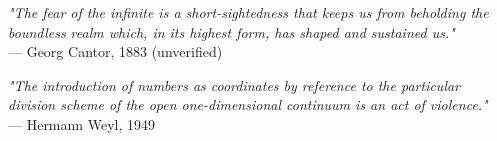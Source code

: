\begin{flushright}
\emph{"The fear of the infinite is a short-sightedness that keeps us from beholding the boundless realm which, in its highest form, has shaped and sustained us."}\\
— Georg Cantor, 1883 (unverified)
\end{flushright}
\vspace{2em}
\begin{flushright}
\emph{"The introduction of numbers as coordinates by reference to the particular division scheme of the open one-dimensional continuum is an act of violence."}\\
— Hermann Weyl, 1949
\end{flushright}
